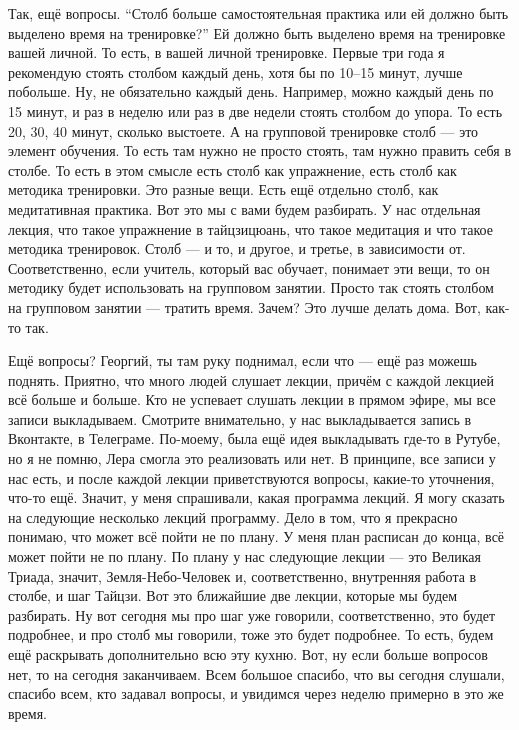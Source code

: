 Так, ещё вопросы. ``Столб больше самостоятельная практика или ей должно быть выделено
время на тренировке?'' Ей должно быть выделено время на тренировке вашей личной. То есть, в вашей
личной тренировке. Первые три года я рекомендую стоять столбом каждый день, хотя бы по 10--15
минут, лучше побольше. Ну, не обязательно каждый день.
Например, можно каждый день по 15 минут, и раз в неделю или раз в две
недели стоять столбом до упора. То есть 20, 30, 40 минут, сколько выстоете. А на групповой
тренировке столб --- это элемент обучения. То есть там нужно не просто стоять, там нужно
править себя в столбе. То есть в этом смысле есть столб как упражнение, есть столб как
методика тренировки. Это разные вещи. Есть ещё отдельно столб, как медитативная практика. Вот
это мы с вами будем разбирать. У нас отдельная лекция, что такое упражнение
в тайцзицюань, что такое
медитация и что такое методика тренировок. Столб --- и то, и другое, и третье, в зависимости от.
Соответственно, если учитель, который вас обучает, понимает эти вещи, то он методику будет
использовать на групповом занятии. Просто так стоять столбом на групповом занятии --- тратить
время. Зачем? Это лучше делать дома. Вот, как-то так.

Ещё вопросы? Георгий, ты там руку
поднимал, если что --- ещё раз можешь поднять. Приятно, что много людей слушает лекции, причём с
каждой лекцией всё больше и больше. Кто не успевает слушать лекции в прямом эфире, мы все
записи выкладываем. Смотрите внимательно, у нас выкладывается запись в Вконтакте, в Телеграме.
По-моему, была ещё идея выкладывать где-то в Рутубе, но я не помню, Лера смогла это реализовать
или нет. В принципе, все записи у нас есть, и после каждой лекции приветствуются вопросы,
какие-то уточнения, что-то ещё. Значит, у меня спрашивали, какая программа лекций. Я могу
сказать на следующие несколько лекций программу. Дело в том, что я прекрасно понимаю, что может
всё пойти не по плану. У меня план расписан до конца, всё может пойти не по плану. По плану у
нас следующие лекции --- это Великая Триада, значит, Земля-Небо-Человек и, соответственно,
внутренняя работа в столбе, и шаг Тайцзи. Вот это ближайшие две лекции, которые мы будем
разбирать. Ну вот сегодня мы про шаг уже говорили, соответственно, это будет подробнее, и про
столб мы говорили, тоже это будет подробнее. То есть,
будем ещё раскрывать дополнительно всю эту кухню. Вот, ну если больше вопросов нет, то
на сегодня заканчиваем. Всем большое спасибо, что вы сегодня слушали, спасибо всем, кто задавал
вопросы, и увидимся через неделю примерно в это же время.
\bye
